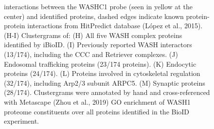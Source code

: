 \begin{figure}[ht]
\begin{fullwidth}
\begin{center}
{		interactions between the WASHC1 probe (seen in yellow at the center) and
		identified proteins, dashed edges indicate known protein-protein interactions
		from HitPredict database (López et al., 2015). (H-I) Clustergrams of: 
		(H) All five WASH complex proteins identified by iBioID.
		(I) Previously reported WASH interactors (13/174), including the CCC and
		Retriever complexes.
		(J) Endosomal trafficking proteins (23/174 proteins).
		(K) Endocytic proteins (24/174).
		(L) Proteins involved in cytoskeletal regulation (32/174), including Arp2/3
		subunit ARPC5.
		(M) Synaptic proteins (28/174). Clustergrams were annotated by hand and
		cross-referenced with Metascape (Zhou et al., 2019) GO enrichment of WASH1
		proteome constituents over all proteins identified in the BioID experiment.
	}
	\label{fig:fig1}
	\end{center}
	\end{fullwidth}
\end{figure}

